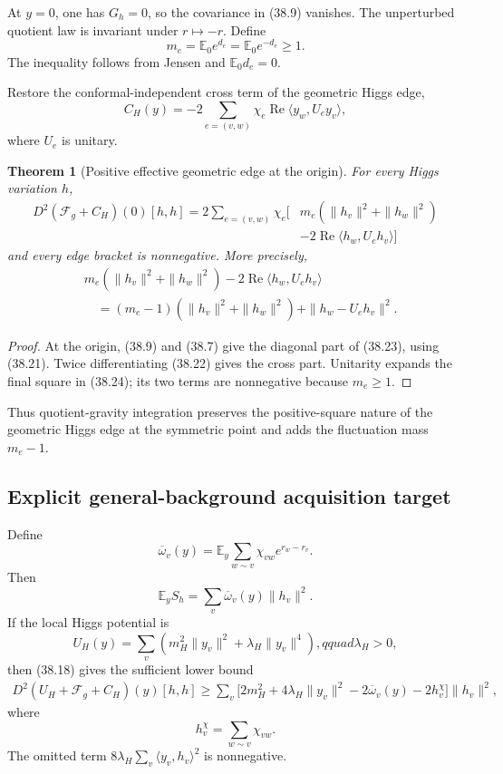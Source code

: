 \documentclass[11pt]{article}
\newtheorem{theorem}{Theorem}[section]
\theoremstyle{remark}
\begin{document}
At \(y=0\), one has \(G_h=0\), so the covariance in (38.9) vanishes.
The unperturbed quotient law is invariant under \(r\mapsto-r\).  Define
\[
 m_e=\mathbb E_0e^{d_e}
 =\mathbb E_0e^{-d_e}\geq1.                        \tag{38.21}
\]
The inequality follows from Jensen and \(\mathbb E_0d_e=0\).

Restore the conformal-independent cross term of the geometric Higgs
edge,
\[
 C_H(y)=-2\sum_{e=(v,w)}\chi_e
 \operatorname{Re}\langle y_w,U_ey_v\rangle,       \tag{38.22}
\]
where \(U_e\) is unitary.

\begin{theorem}[Positive effective geometric edge at the origin]
\label{thm:v17v38-origin}
For every Higgs variation \(h\),
\[
\begin{aligned}
 D^2(\mathcal F_g+C_H)(0)[h,h]
 =2\sum_{e=(v,w)}\chi_e\bigl[
 &m_e(\|h_v\|^2+\|h_w\|^2)\\
 &-2\operatorname{Re}\langle h_w,U_eh_v\rangle
 \bigr]                                           \tag{38.23}
\end{aligned}
\]
and every edge bracket is nonnegative.  More precisely,
\[
\begin{aligned}
 &m_e(\|h_v\|^2+\|h_w\|^2)
 -2\operatorname{Re}\langle h_w,U_eh_v\rangle\\
 &\quad=(m_e-1)(\|h_v\|^2+\|h_w\|^2)
 +\|h_w-U_eh_v\|^2.                               \tag{38.24}
\end{aligned}
\]
\end{theorem}

\begin{proof}
At the origin, (38.9) and (38.7) give the diagonal part of (38.23),
using (38.21).  Twice differentiating (38.22) gives the cross part.
Unitarity expands the final square in (38.24); its two terms are
nonnegative because \(m_e\geq1\).
\end{proof}

Thus quotient-gravity integration preserves the positive-square nature
of the geometric Higgs edge at the symmetric point and adds the
fluctuation mass \(m_e-1\).

\subsection{Explicit general-background acquisition target}

Define
\[
 \overline\omega_v(y)
 =\mathbb E_y\sum_{w\sim v}\chi_{vw}e^{r_w-r_v}.   \tag{38.25}
\]
Then
\[
 \mathbb E_yS_h
 =\sum_v\overline\omega_v(y)\|h_v\|^2.            \tag{38.26}
\]
If the local Higgs potential is
\[
 U_H(y)=\sum_v\left(m_H^2\|y_v\|^2
 +\lambda_H\|y_v\|^4\right),qquad\lambda_H>0,   \tag{38.27}
\]
then (38.18) gives the sufficient lower bound
\[
\begin{aligned}
 D^2(U_H+\mathcal F_g+C_H)(y)[h,h]
 \geq\sum_v\bigl[
 2m_H^2+4\lambda_H\|y_v\|^2
 -2\overline\omega_v(y)-2h_v^\chi
 \bigr]\|h_v\|^2,                                \tag{38.28}
\end{aligned}
\]
where
\[
 h_v^\chi=\sum_{w\sim v}\chi_{vw}.                \tag{38.29}
\]
The omitted term
\(8\lambda_H\sum_v\langle y_v,h_v\rangle^2\) is nonnegative.
\end{document}
